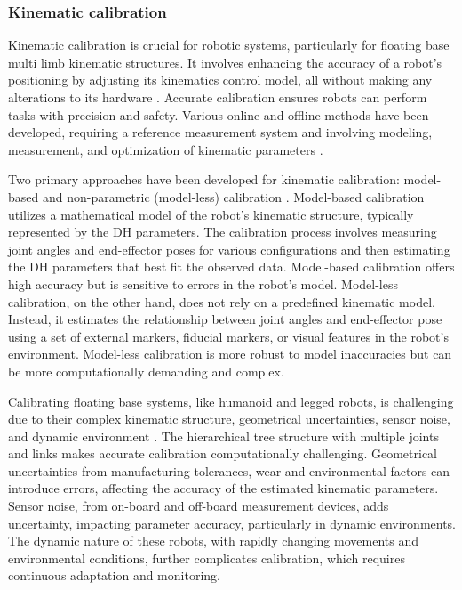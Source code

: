 \subsubsection{Kinematic calibration}
Kinematic calibration is crucial for robotic systems, particularly for floating base multi limb kinematic structures. It involves enhancing the accuracy of a robot's positioning by adjusting its kinematics control model, all without making any alterations to its hardware \cite{ChenGang2014Reviewkinematicscalibration}. Accurate calibration ensures robots can perform tasks with precision and safety. Various online and offline methods have been developed, requiring a reference measurement system and involving modeling, measurement, and optimization of kinematic parameters \cite{Petrivc2023Kinematicmodelcalibration}.

Two primary approaches have been developed for kinematic calibration: model-based and non-parametric (model-less) calibration \cite{ChenGang2014Reviewkinematicscalibration}. Model-based calibration utilizes a mathematical model of the robot's kinematic structure, typically represented by the DH parameters. The calibration process involves measuring joint angles and end-effector poses for various configurations and then estimating the DH parameters that best fit the observed data. Model-based calibration offers high accuracy but is sensitive to errors in the robot's model. Model-less calibration, on the other hand, does not rely on a predefined kinematic model. Instead, it estimates the relationship between joint angles and end-effector pose using a set of external markers, fiducial markers, or visual features in the robot's environment. Model-less calibration is more robust to model inaccuracies but can be more computationally demanding and complex.

Calibrating floating base systems, like humanoid and legged robots, is challenging due to their complex kinematic structure, geometrical uncertainties, sensor noise, and dynamic environment . The hierarchical tree structure with multiple joints and links makes accurate calibration computationally challenging. Geometrical uncertainties from manufacturing tolerances, wear and environmental factors can introduce errors, affecting the accuracy of the estimated kinematic parameters. Sensor noise, from on-board and off-board measurement devices, adds uncertainty, impacting parameter accuracy, particularly in dynamic environments. The dynamic nature of these robots, with rapidly changing movements and environmental conditions, further complicates calibration, which requires continuous adaptation and monitoring.

